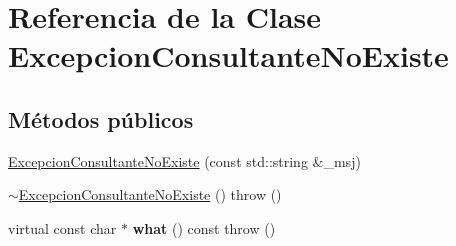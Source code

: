 \hypertarget{classExcepcionConsultanteNoExiste}{\section{\-Referencia de la \-Clase \-Excepcion\-Consultante\-No\-Existe}
\label{classExcepcionConsultanteNoExiste}
}
\subsection*{\-Métodos públicos}
\begin{DoxyCompactItemize}
\item 
\hyperlink{classExcepcionConsultanteNoExiste_aad192a63ab360fa6aca6c378b9e09933}{\-Excepcion\-Consultante\-No\-Existe} (const std\-::string \&\-\_\-msj)
\item 
\hyperlink{classExcepcionConsultanteNoExiste_abb2fe198a25b770d5458c40ff064f92a}{$\sim$\-Excepcion\-Consultante\-No\-Existe} ()  throw ()
\item 
\hypertarget{classExcepcionConsultanteNoExiste_a31314b33cc43cd03a0f7163ed94b21de}{virtual const char $\ast$ {\bfseries what} () const   throw ()}\label{classExcepcionConsultanteNoExiste_a31314b33cc43cd03a0f7163ed94b21de}

\end{DoxyCompactItemize}


